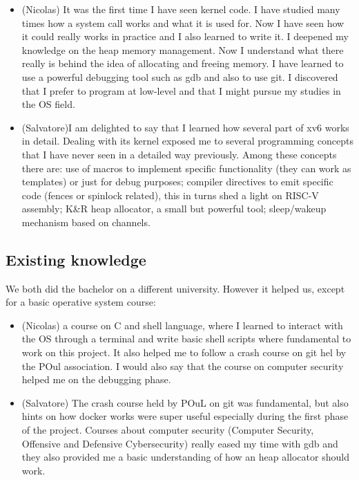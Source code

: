 \documentclass[10pt,a4]{article}
\begin{document}
\begin{itemize}
    \item (Nicolas) It was the first time I have seen kernel code. I have studied many times how a system call works and what it is used for. Now I have seen how it could really works in practice and I also learned to write it. I deepened my knowledge on the heap memory management. Now I understand what there really is behind the idea of allocating and freeing memory. I have learned to use a powerful debugging tool such as gdb and also to use git. I discovered that I prefer to program at low-level and that I might pursue my studies in the OS field.
    
    
    \item (Salvatore)I am delighted to say that I learned how several part of xv6 works in detail. 
    Dealing with its kernel exposed me to several programming concepts that I have never seen in a detailed way previously. 
    Among these concepts there are: use of macros to implement specific functionality (they can work as templates) or just for debug purposes; 
    compiler directives to emit specific code (fences or spinlock related), this in turns shed a light on RISC-V assembly;
    K\&R heap allocator, a small but powerful tool; sleep/wakeup mechanism based on channels.

\end{itemize}

 

\subsection{Existing knowledge}

We both did the bachelor on a different university. However it helped us, except for a basic operative system course:
\begin{itemize}
    \item (Nicolas) a course on C and shell language, where I learned to interact with the OS through a terminal and write basic shell scripts where fundamental to work on this project. It also helped me to follow a crash course on git hel by the POul association. I would also say that the course on computer security helped me on the debugging phase.
    \item(Salvatore) The crash course held by POuL on git was fundamental, but also hints on how docker works were super useful especially during the first phase of the project.
    Courses about computer security (Computer Security, Offensive and Defensive Cybersecurity) really eased my time with gdb and they also provided me a basic understanding of how an heap allocator should work.
\end{itemize}
\end{document}
